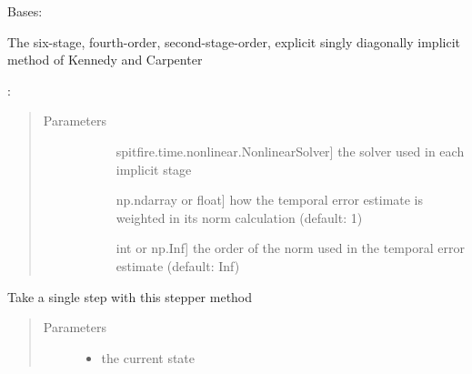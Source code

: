 \documentclass[letterpaper,10pt,english]{sphinxmanual}
\begin{document}
\begin{fulllineitems}
\label{\detokenize{spitfire.time.methods:spitfire.time.methods.ESDIRK64}}
Bases: {\hyperref[\detokenize{spitfire.time.methods:spitfire.time.methods.AdaptiveImplicitTimeStepper}]{}}

The six-stage, fourth-order, second-stage-order, explicit singly diagonally implicit method of Kennedy and Carpenter

:
\begin{quote}\begin{description}
\item[{Parameters}] \leavevmode\begin{description}
\item[{}] \leavevmode{[}spitfire.time.nonlinear.NonlinearSolver{]}
the solver used in each implicit stage

\item[{}] \leavevmode{[}np.ndarray or float{]}
how the temporal error estimate is weighted in its norm calculation (default: 1)

\item[{}] \leavevmode{[}int or np.Inf{]}
the order of the norm used in the temporal error estimate (default: Inf)

\end{description}

\end{description}\end{quote}

\begin{fulllineitems}
\label{\detokenize{spitfire.time.methods:spitfire.time.methods.ESDIRK64.single_step}}
Take a single step with this stepper method
\begin{quote}\begin{description}
\item[{Parameters}] \leavevmode\begin{itemize}
\item {} 
 \textendash{} the current state


\end{itemize}
\end{description}
\end{quote}
\end{fulllineitems}
\end{fulllineitems}
\end{document}
